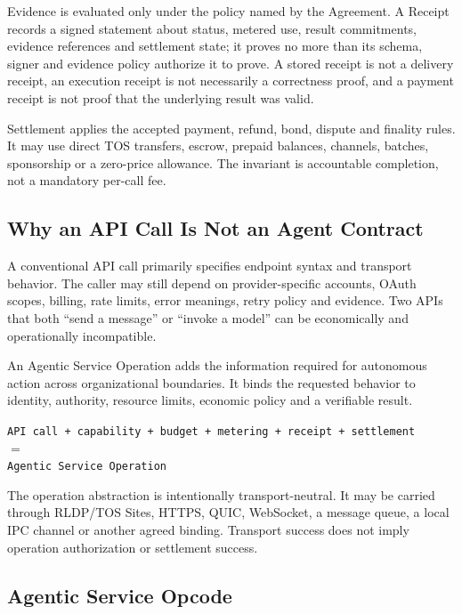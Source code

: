 \documentclass[11pt,oneside]{article}
\begin{document}
Evidence is evaluated only under the policy named by the Agreement. A Receipt records a
signed statement about status, metered use, result commitments, evidence references and
settlement state; it proves no more than its schema, signer and evidence policy authorize it
to prove. A stored receipt is not a delivery receipt, an execution receipt is not necessarily
a correctness proof, and a payment receipt is not proof that the underlying result was valid.

Settlement applies the accepted payment, refund, bond, dispute and finality rules. It may use
direct TOS transfers, escrow, prepaid balances, channels, batches, sponsorship or a zero-price
allowance. The invariant is accountable completion, not a mandatory per-call fee.

\subsection{Why an API Call Is Not an Agent Contract}

A conventional API call primarily specifies endpoint syntax and transport behavior. The
caller may still depend on provider-specific accounts, OAuth scopes, billing, rate limits,
error meanings, retry policy and evidence. Two APIs that both ``send a message'' or ``invoke a
model'' can be economically and operationally incompatible.

An Agentic Service Operation adds the information required for autonomous action across
organizational boundaries. It binds the requested behavior to identity, authority, resource
limits, economic policy and a verifiable result.

\begin{center}
\texttt{API call + capability + budget + metering + receipt + settlement}\\
$=$\\
\texttt{Agentic Service Operation}
\end{center}

The operation abstraction is intentionally transport-neutral. It may be carried through
RLDP/TOS Sites, HTTPS, QUIC, WebSocket, a message queue, a local IPC channel or another agreed
binding. Transport success does not imply operation authorization or settlement success.

\subsection{Agentic Service Opcode}
\end{document}
